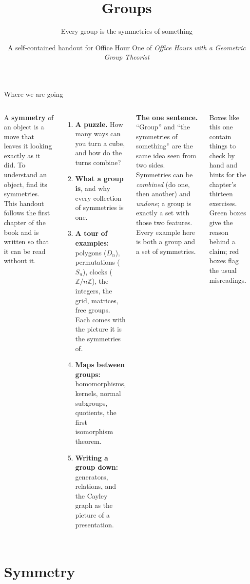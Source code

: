\documentclass[aspectratio=169,10pt]{beamer}
\title[Groups]{Groups}
\institute[]{}
\subtitle{Every group is the symmetries of something}
\author[Office Hour One · handout]{A self-contained handout for Office Hour One of \emph{Office Hours with a Geometric Group Theorist}}
\date{}
\newcommand{\Z}{\mathbb{Z}}
\begin{document}
\begin{frame}[plain]
\titlepage
\begin{center}\scalebox{0.85}{\figtriangle}\end{center}
\end{frame}

\begin{frame}{Where we are going}
\begin{columns}[T]
\small A \textbf{symmetry} of an object is a move that leaves it looking exactly as it did. To understand an object, find its symmetries. This handout follows the first chapter of the book and is written so that it can be read without it.
\begin{enumerate}\small
\item \textbf{A puzzle.} How many ways can you turn a cube, and how do the turns combine?
\item \textbf{What a group is}, and why every collection of symmetries is one.
\item \textbf{A tour of examples:} polygons ($D_n$), permutations ($S_n$), clocks ($\Z/n\Z$), the integers, the grid, matrices, free groups. Each comes with the picture it is the symmetries of.
\item \textbf{Maps between groups:} homomorphisms, kernels, normal subgroups, quotients, the first isomorphism theorem.
\item \textbf{Writing a group down:} generators, relations, and the Cayley graph as the picture of a presentation.
\end{enumerate}
\begin{bigbox}
\textbf{The one sentence.} ``Group'' and ``the symmetries of something'' are the same idea seen from two sides. Symmetries can be \emph{combined} (do one, then another) and \emph{undone}; a group is exactly a set with those two features. Every example here is both a group and a set of symmetries.
\end{bigbox}
\begin{trybox}
Boxes like this one contain things to check by hand and hints for the chapter's thirteen exercises. Green boxes give the reason behind a claim; red boxes flag the usual misreadings.
\end{trybox}
\end{columns}
\end{frame}

\section{Symmetry}
\end{document}
